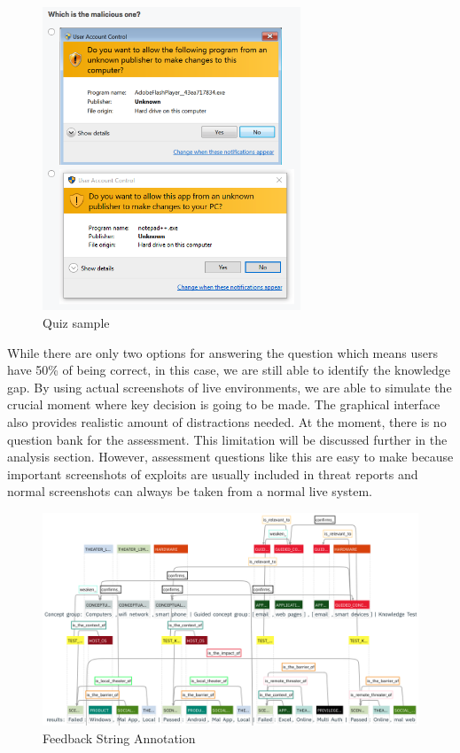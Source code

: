 \documentclass[conference]{IEEEtran}
\begin{document}
\begin{figure}[ht]
  \centering
  \includegraphics[width=7.7cm]{images/quiz-sample}
  \caption{Quiz sample}
  \label{Figure:quiz-sample}
\end{figure}

While there are only two options for answering the question which means users have 50\% of being correct, in this case, we are still able to identify the knowledge gap. By using actual screenshots of live environments, we are able to simulate the crucial moment where key decision is going to be made. The graphical interface also provides realistic amount of distractions needed. At the moment, there is no question bank for the assessment. This limitation will be discussed further in the analysis section. However, assessment questions like this are easy to make because important screenshots of exploits are usually included in threat reports and normal screenshots can always be taken from a normal live system.

\begin{figure}[ht]
  \centering
  \includegraphics[width=16cm]{./images/feedbackString}
  \caption{Feedback String Annotation}
  \label{Figure:feedbackString}
\end{figure}
\end{document}
